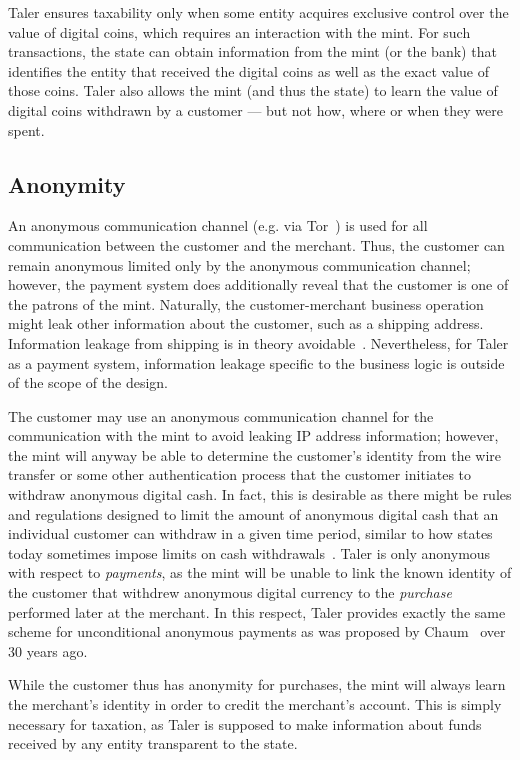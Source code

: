 \documentclass{llncs}
\begin{document}
Taler ensures taxability only when some entity acquires exclusive
control over the value of digital coins, which requires an interaction
with the mint.  For such transactions, the state can obtain
information from the mint (or the bank) that identifies the entity
that received the digital coins as well as the exact value of those
coins.  Taler also allows the mint (and thus the state) to learn the
value of digital coins withdrawn by a customer --- but not how, where
or when they were spent.

\subsection{Anonymity}

An anonymous communication channel (e.g. via Tor~\cite{tor-design}) is
used for all communication between the customer and the merchant.
Thus, the customer can remain anonymous limited only by the anonymous
communication channel; however, the payment system does additionally
reveal that the customer is one of the patrons of the mint.
Naturally, the customer-merchant business operation might leak other
information about the customer, such as a shipping address.
Information leakage from shipping is in theory avoidable~\cite{apod}.
Nevertheless, for Taler as a payment system, information leakage
specific to the business logic is outside of the scope of the design.

The customer may use an anonymous communication channel for the
communication with the mint to avoid leaking IP address information;
however, the mint will anyway be able to determine the customer's
identity from the wire transfer or some other authentication process
that the customer initiates to withdraw anonymous digital cash.  In
fact, this is desirable as there might be rules and regulations
designed to limit the amount of anonymous digital cash that an
individual customer can withdraw in a given time period, similar to
how states today sometimes impose limits on cash
withdrawals~\cite{france2015cash,greece2015cash}.  Taler is only
anonymous with respect to {\em payments}, as the mint will be unable
to link the known identity of the customer that withdrew anonymous
digital currency to the {\em purchase} performed later at the
merchant.  In this respect, Taler provides exactly the same scheme for
unconditional anonymous payments as was proposed by
Chaum~\cite{chaum1983blind,chaum1990untraceable} over 30 years ago.

While the customer thus has anonymity for purchases, the mint will
always learn the merchant's identity in order to credit the merchant's
account.  This is simply necessary for taxation, as Taler is supposed
to make information about funds received by any entity transparent
to the state.
\end{document}
